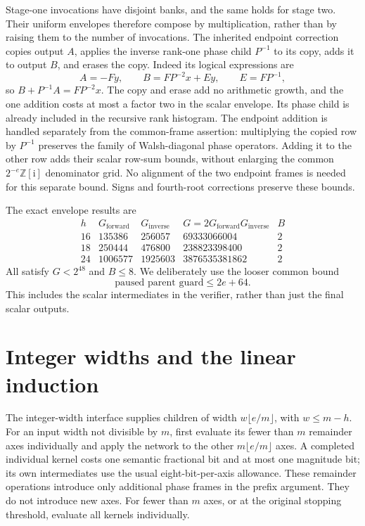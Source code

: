 \documentclass[11pt]{article}
\newcommand{\ii}{\mathrm i}
\newcommand{\Z}{\mathbb Z}
\begin{document}
Stage-one invocations have disjoint banks, and the same holds for stage two.
Their uniform envelopes therefore compose by multiplication, rather than
by raising them to the number of invocations. The inherited endpoint
correction copies output $A$, applies the inverse rank-one phase child
$P^{-1}$ to its copy, adds it to output $B$, and erases the copy.
Indeed its logical expressions are
\[
 A=-Fy,\qquad B=FP^{-2}x+Ey,\qquad E=FP^{-1},
\]
so $B+P^{-1}A=FP^{-2}x$. The copy and erase add no arithmetic growth,
and the one addition costs at most a factor two in the scalar envelope.
Its phase child is already included in the recursive rank histogram.
The endpoint addition is handled separately from the common-frame assertion:
multiplying the copied row by $P^{-1}$ preserves the family of Walsh-diagonal
phase operators. Adding it to the other row adds their scalar row-sum bounds,
without enlarging the common $2^{-e}\Z[\ii]$ denominator grid. No alignment
of the two endpoint frames is needed for this separate bound.
Signs and fourth-root corrections preserve these bounds.

The exact envelope results are
\[
\begin{array}{c|r|r|r|r}
 h&G_{\mathrm{forward}}&G_{\mathrm{inverse}}&
       G=2G_{\mathrm{forward}}G_{\mathrm{inverse}}&B\\\hline
16&135386&256057&69333066004&2\\
18&250444&476800&238823398400&2\\
24&1006577&1925603&3876535381862&2
\end{array}
\]
All satisfy $G<2^{48}$ and $B\le8$. We deliberately use the looser
common bound
\[
               \text{paused parent guard}\le 2e+64.       \tag{1}
\]
This includes the scalar intermediates in the verifier, rather than just
the final scalar outputs.

\section{Integer widths and the linear induction}
The integer-width interface supplies children of width
$w\lfloor e/m\rfloor$, with $w\le m-h$.
For an input width not divisible by $m$, first evaluate its fewer than $m$
remainder axes individually and apply the network to the other
$m\lfloor e/m\rfloor$ axes. A completed individual kernel costs one
semantic fractional bit and at most one magnitude bit; its own
intermediates use the usual eight-bit-per-axis allowance.
These remainder operations introduce only additional phase frames in the
prefix argument. They do not introduce new axes. For fewer than $m$ axes,
or at the original stopping threshold, evaluate all kernels individually.
\end{document}
